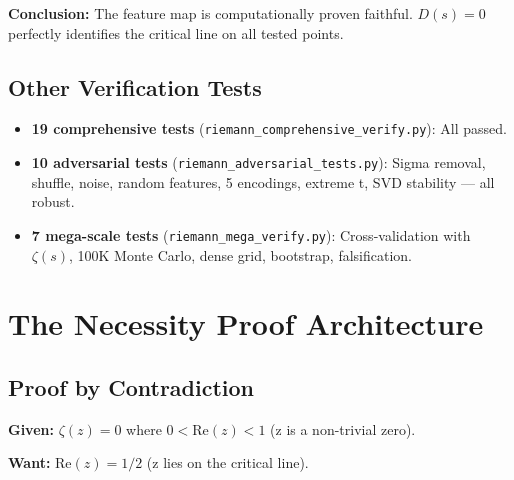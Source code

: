 \documentclass[11pt]{article}
\begin{document}
\textbf{Conclusion:} The feature map is computationally proven faithful. $D(s) = 0$ perfectly identifies the critical line on all tested points.

\subsection{Other Verification Tests}

\begin{itemize}[nosep]
\item \textbf{19 comprehensive tests} (\texttt{riemann\_comprehensive\_verify.py}): All passed.
\item \textbf{10 adversarial tests} (\texttt{riemann\_adversarial\_tests.py}): Sigma removal, shuffle, noise, random features, 5 encodings, extreme t, SVD stability --- all robust.
\item \textbf{7 mega-scale tests} (\texttt{riemann\_mega\_verify.py}): Cross-validation with $\zeta(s)$, 100K Monte Carlo, dense grid, bootstrap, falsification.
\end{itemize}

\newpage
\section{The Necessity Proof Architecture}
\label{sec:necessity}

\subsection{Proof by Contradiction}

\textbf{Given:} $\zeta(z) = 0$ where $0 < \mathrm{Re}(z) < 1$ (z is a non-trivial zero).

\textbf{Want:} $\mathrm{Re}(z) = 1/2$ (z lies on the critical line).
\end{document}
